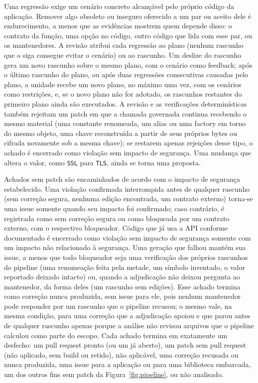 \documentclass[conference]{IEEEtran}
\begin{document}
Uma regressão exige um cenário concreto alcançável pelo próprio código da
aplicação. Remover algo obsoleto ou inseguro oferecido a um par ou aceito dele
é endurecimento, a menos que as evidências mostrem quem depende disso: o
contrato da função, uma opção no código, outro código que lida com esse par, ou
os mantenedores. A revisão atribui cada regressão ao plano (nenhum rascunho que
o siga consegue evitar o cenário) ou ao rascunho. Um deslize do rascunho gera
um novo rascunho sobre o mesmo plano, com o cenário como feedback; após o último
rascunho do plano, ou após duas regressões consecutivas causadas pelo plano, a
unidade recebe um novo plano, no máximo uma vez, com os cenários como
restrições, e, se o novo plano não for adotado, os rascunhos restantes do
primeiro plano ainda são executados. A revisão e as verificações
determinísticas também rejeitam um patch em que a chamada governada continua
recebendo o mesmo material (uma constante
renomeada, um alias ou uma factory em torno do mesmo objeto, uma chave
reconstruída a partir de seus próprios bytes ou cifrada novamente sob a mesma
chave); se restarem apenas rejeições desse tipo, o achado é encerrado como
violação sem impacto de segurança. Uma mudança que altera o valor, como
\texttt{SSL} para \texttt{TLS}, ainda se torna uma proposta.

Achados sem patch são encaminhados de acordo com o impacto de segurança
estabelecido. Uma violação confirmada interrompida antes de qualquer rascunho
(sem correção segura, nenhuma edição encontrada, um contrato externo) torna-se
uma issue somente quando seu impacto foi confirmado; caso contrário, é
registrada como sem correção segura ou como bloqueada por um contrato externo,
com o respectivo bloqueador. Código que já usa a API conforme documentado é
encerrado como violação sem impacto de segurança somente com um impacto não
relacionado à segurança. Uma geração que falhou mantém sua issue, a menos que
todo bloqueador seja uma verificação dos próprios rascunhos do pipeline (uma
renomeação feita pela metade, um símbolo inventado, o valor reportado deixado
intacto) ou, quando a adjudicação não deixou pergunta ao mantenedor, da forma
deles (um rascunho sem edições). Esse achado termina como correção nunca
produzida, sem issue para ele, pois nenhum mantenedor pode responder por um
rascunho que o pipeline recusou; o mesmo vale, na mesma condição, para uma
correção que a adjudicação apoiou e que parou antes de qualquer rascunho apenas
porque a análise não revisou arquivos que o pipeline calculou como parte do
escopo. Cada achado
termina em exatamente um desfecho: um pull request pronto (ou um já aberto), um
patch sem pull request (não aplicado, sem build ou retido), não aplicável, uma
correção recusada ou nunca produzida, uma issue para a aplicação ou para uma
biblioteca embarcada, um dos outros fins sem patch da
Figura~\ref{fig:pipeline}, ou não analisado.
\end{document}
